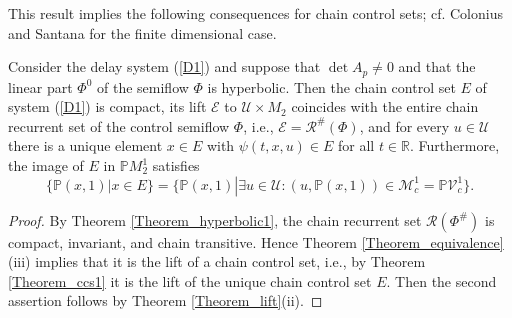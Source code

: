 \documentclass{siamltex}%
\begin{document}
This result implies the following consequences for chain control sets; cf.
Colonius and Santana \cite[Theorem 35]{ColS24} for the finite dimensional case.

\begin{corollary}
\label{Corollary_lift}Consider the delay system (\ref{D1}) and suppose that
$\det A_{p}\not =0$ and that the linear part $\Phi^{0}$ of the semiflow $\Phi$
is hyperbolic. Then the chain control set $E$ of system (\ref{D1}) is compact,
its lift $\mathcal{E}$ to $\mathcal{U}\times M_{2}$ coincides with the entire
chain recurrent set of the control semiflow $\Phi$, i.e., $\mathcal{E}%
=\mathcal{R}^{\#}(\Phi)$, and for every $u\in\mathcal{U}$ there is a unique
element $x\in E$ with $\psi(t,x,u)\in E$ for all $t\in\mathbb{R}$.
Furthermore, the image of $E$ in $\mathbb{P}M_{2}^{1}$ satisfies%
\[
\{\mathbb{P}(x,1)\left\vert x\in E\right.  \}=\{\mathbb{P}(x,1)\left\vert
\exists u\in\mathcal{U}:(u,\mathbb{P}(x,1))\in\mathcal{M}_{c}^{1}%
=\mathbb{P}\mathcal{V}_{c}^{1}\right.  \}.
\]

\end{corollary}

\begin{proof}
By Theorem \ref{Theorem_hyperbolic1}, the chain recurrent set $\mathcal{R}%
(\Phi^{\#})$ is compact, invariant, and chain transitive. Hence Theorem
\ref{Theorem_equivalence}(iii) implies that it is the lift of a chain control
set, i.e., by Theorem \ref{Theorem_ccs1} it is the lift of the unique chain
control set $E$. Then the second assertion follows by Theorem
\ref{Theorem_lift}(ii).
\end{proof}

\bigskip
\end{document}
